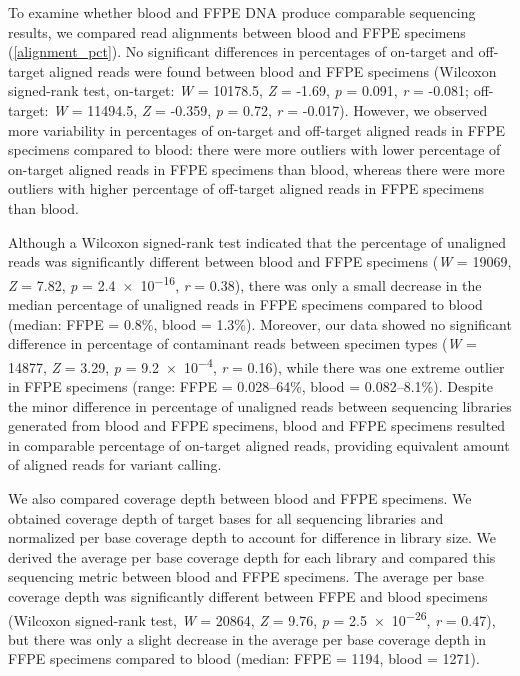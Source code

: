 \documentclass{bmcart}
\begin{document}
To examine whether blood and FFPE DNA produce comparable sequencing results, we compared read alignments between blood and FFPE specimens (\autoref{alignment_pct}). No significant differences in percentages of on-target and off-target aligned reads were found between blood and FFPE specimens (Wilcoxon signed-rank test, on-target: \textit{W} = \num{10178.5}, \textit{Z} = -1.69, \textit{p} = \num{0.091}, \textit{r} = -0.081; off-target: \textit{W} = \num{11494.5}, \textit{Z} = -0.359, \textit{p} = \num{0.72}, \textit{r} = -0.017). However, we observed more variability in percentages of on-target and off-target aligned reads in FFPE specimens compared to blood: there were more outliers with lower percentage of on-target aligned reads in FFPE specimens than blood, whereas there were more outliers with higher percentage of off-target aligned reads in FFPE specimens than blood.

Although a Wilcoxon signed-rank test indicated that the percentage of unaligned reads was significantly different between blood and FFPE specimens (\textit{W} = \num{19069}, \textit{Z} = 7.82, \textit{p} = \num{2.4e-16}, \textit{r} = 0.38), there was only a small decrease in the median percentage of unaligned reads in FFPE specimens compared to blood (median: FFPE = 0.8\%, blood = 1.3\%). Moreover, our data showed no significant difference in percentage of contaminant reads between specimen types (\textit{W} = \num{14877}, \textit{Z} = 3.29, \textit{p} = \num{9.2e-4}, \textit{r} = 0.16), while there was one extreme outlier in FFPE specimens (range: FFPE = 0.028--64\%, blood = 0.082--8.1\%). Despite the minor difference in percentage of unaligned reads between sequencing libraries generated from blood and FFPE specimens, blood and FFPE specimens resulted in comparable percentage of on-target aligned reads, providing equivalent amount of aligned reads for variant calling.

We also compared coverage depth between blood and FFPE specimens. We obtained coverage depth of target bases for all sequencing libraries and normalized per base coverage depth to account for difference in library size. We derived the average per base coverage depth for each library and compared this sequencing metric between blood and FFPE specimens. The average per base coverage depth was significantly different between FFPE and blood specimens (Wilcoxon signed-rank test, \textit{W} = \num{20864}, \textit{Z} = 9.76, \textit{p} = \num{2.5e-26}, \textit{r} = 0.47), but there was only a slight decrease in the average per base coverage depth in FFPE specimens compared to blood (median: FFPE = 1194, blood = 1271).
\end{document}
